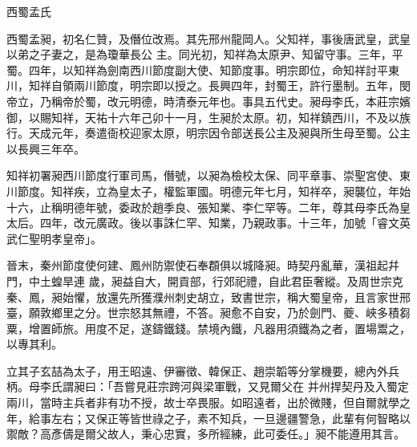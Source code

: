 
\begin{pinyinscope}

 西蜀孟氏



 西蜀孟昶，初名仁贊，及僭位改焉。其先邢州龍岡人。父知祥，事後唐武皇，武皇以弟之子妻之，是為瓊華長公
 主。同光初，知祥為太原尹、知留守事。三年，平蜀。四年，以知祥為劍南西川節度副大使、知節度事。明宗即位，命知祥討平東川，知祥自領兩川節度，明宗即以授之。長興四年，封蜀王，許行墨制。五年，閔帝立，乃稱帝於蜀，改元明德，時清泰元年也。事具五代史。昶母李氏，本莊宗嬪御，以賜知祥，天祐十六年己卯十一月，生昶於太原。初，知祥鎮西川，不及以族行。天成元年，奏遣衙校迎家太原，明宗因令部送長公主及昶與所生母至蜀。公主
 以長興三年卒。



 知祥初署昶西川節度行軍司馬，僭號，以昶為檢校太保、同平章事、崇聖宮使、東川節度。知祥疾，立為皇太子，權監軍國。明德元年七月，知祥卒，昶襲位，年始十六，止稱明德年號，委政於趙季良、張知業、李仁罕等。二年，尊其母李氏為皇太后。四年，改元廣政。後以事誅仁罕、知業，乃親政事。十三年，加號「睿文英武仁聖明孝皇帝」。



 晉末，秦州節度使何建、鳳州防禦使石奉頵俱以城降昶。時契丹亂華，漢祖起幷門，中土蝗旱連
 歲，昶益自大，開貢部，行郊祀禮，自此君臣奢縱。及周世宗克秦、鳳，昶始懼，放還先所獲濮州刺史胡立，致書世宗，稱大蜀皇帝，且言家世邢臺，願敦鄉里之分。世宗怒其無禮，不答。昶愈不自安，乃於劍門、夔、峽多積芻粟，增置師旅。用度不足，遂鑄鐵錢。禁境內鐵，凡器用須鐵為之者，置場鬻之，以專其利。



 立其子玄喆為太子，用王昭遠、伊審徵、韓保正、趙崇韜等分掌機要，總內外兵柄。母李氏謂昶曰：「吾嘗見莊宗跨河與梁軍戰，又見爾父在
 并州捍契丹及入蜀定兩川，當時主兵者非有功不授，故士卒畏服。如昭遠者，出於微賤，但自爾就學之年，給事左右；又保正等皆世祿之子，素不知兵，一旦邊疆警急，此輩有何智略以禦敵？高彥儔是爾父故人，秉心忠實，多所經練，此可委任。」昶不能遵用其言。




\end{pinyinscope}
